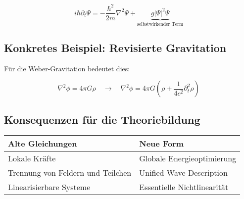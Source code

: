 \begin{equation}
    i\hbar\partial_t \Psi = -\frac{\hbar^2}{2m}\nabla^2 \Psi + \underbrace{g|\Psi|^2\Psi}_{\text{selbstwirkender Term}}
\end{equation}

\subsection{Konkretes Beispiel: Revisierte Gravitation}
Für die Weber-Gravitation bedeutet dies:

\begin{equation}
    \nabla^2 \phi = 4\pi G\rho \quad \rightarrow \quad \nabla^2 \phi = 4\pi G\left(\rho + \frac{1}{4c^2}\partial_t^2\rho\right)
\end{equation}

\subsection{Konsequenzen für die Theoriebildung}
\begin{tabular}{p{}p{}}
    \hline
    \textbf{Alte Gleichungen} & \textbf{Neue Form} \\
    \hline
    Lokale Kräfte & Globale Energieoptimierung \\
    Trennung von Feldern und Teilchen & Unified Wave Description \\
    Linearisierbare Systeme & Essentielle Nichtlinearität \\
    \hline
\end{tabular}
